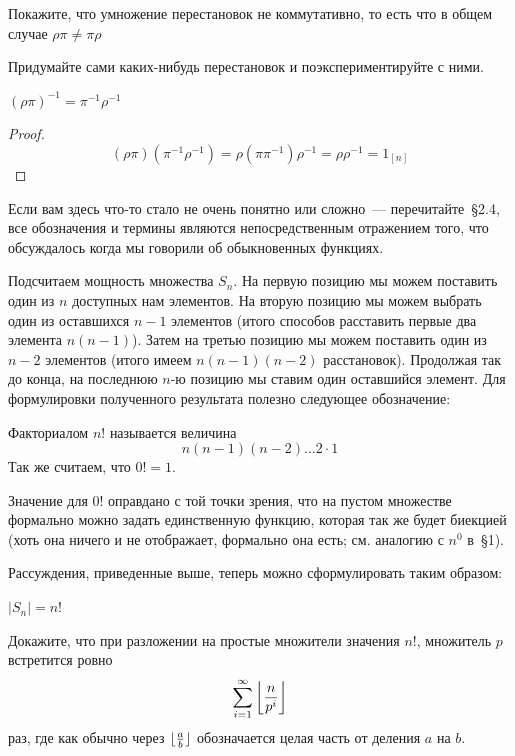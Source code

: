 \begin{exercise}
Покажите, что умножение перестановок не коммутативно, то есть что в общем случае $\rho\pi \not= \pi\rho$
\end{exercise}

\begin{exercise}
Придумайте сами каких-нибудь перестановок и поэкспериментируйте с ними.
\end{exercise}

\begin{thm}\label{thm:perminv}
$(\rho\pi)^{-1} = \pi^{-1}\rho^{-1}$
\end{thm}
\begin{proof}
$$(\rho\pi)(\pi^{-1}\rho^{-1}) = \rho(\pi\pi^{-1})\rho^{-1} = \rho\rho^{-1} = 1_{[n]}$$
\end{proof}

Если вам здесь что-то стало не очень понятно или сложно~— перечитайте~\S2.4, все обозначения и термины являются непосредственным отражением того, что обсуждалось когда мы говорили об обыкновенных функциях.

Подсчитаем мощность множества $S_n$. На первую позицию мы можем поставить один из $n$ доступных нам элементов. На вторую позицию мы можем выбрать один из оставшихся $n-1$ элементов (итого способов расставить первые два элемента $n(n-1)$). Затем на третью позицию мы можем поставить один из $n-2$ элементов (итого имеем $n(n-1)(n-2)$ расстановок). Продолжая так до конца, на последнюю $n$-ю позицию мы ставим один оставшийся элемент. Для формулировки полученного результата полезно следующее обозначение:

\begin{definition}
Факториалом $n!$ называется величина $$n(n-1)(n-2)\ldots 2\cdot 1$$
Так же считаем, что $0! = 1$.
\end{definition}

Значение для $0!$ оправдано с той точки зрения, что на пустом множестве формально можно задать единственную функцию, которая так же будет биекцией (хоть она ничего и не отображает, формально она есть; см. аналогию с $n^0$ в~\S1).

Рассуждения, приведенные выше, теперь можно сформулировать таким образом:

\begin{thm}\label{thm:symgrpord}
$|S_n| = n!$
\end{thm}

\begin{exercise}
Докажите, что при разложении на простые множители значения $n!$, множитель $p$ встретится ровно
$$\sum_{i=1}^\infty \left\lfloor {n \over p^i} \right\rfloor$$
раз, где как обычно через $\lfloor {a\over b}\rfloor$ обозначается целая часть от деления $a$ на $b$.
\end{exercise}

